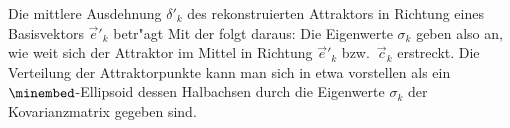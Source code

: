Die mittlere Ausdehnung $\delta'_k$ des rekonstruierten Attraktors in Richtung eines Basisvektors
$\vec e'_k$ betr"agt
Mit der   folgt daraus:
Die Eigenwerte $\sigma_k$ geben also an, wie weit sich der Attraktor im Mittel in Richtung
$\vec e'_k$ bzw.\ $\vec c_k$ erstreckt. Die Verteilung der Attraktorpunkte kann man sich
in etwa vorstellen als ein $\minembed$-Ellipsoid dessen Halbachsen durch die Eigenwerte
$\sigma_k$ der Kovarianzmatrix gegeben sind.

